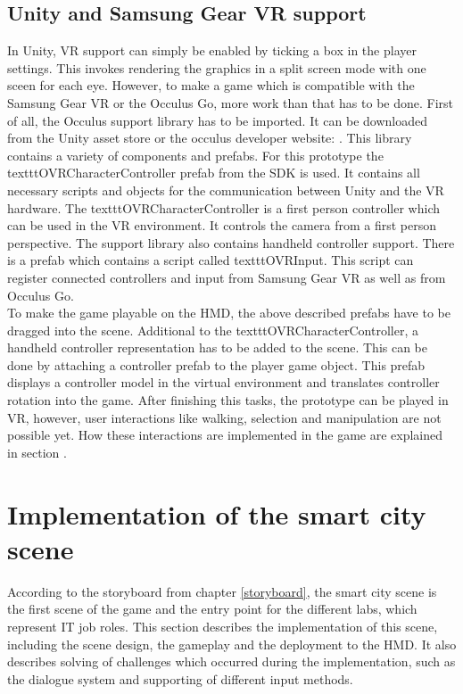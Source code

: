 \subsection{Unity and Samsung Gear VR support} \label{gearvrsupport}
In Unity, VR support can simply be enabled by ticking a box in the player settings. This invokes rendering the graphics in a split screen mode with one sceen for each eye. However, to make a game which is compatible with the Samsung Gear VR or the Occulus Go, more work than that has to be done. First of all, the Occulus support library has to be imported. It can be downloaded from the Unity asset store or the occulus developer website: \cite{Occulus.2018}. This library contains a variety of components and prefabs. For this prototype the texttt{OVRCharacterController} prefab from the SDK is used. It contains all necessary scripts and objects for the communication between Unity and the VR hardware. The texttt{OVRCharacterController} is a first person controller which can be used in the VR environment. It controls the camera from a first person perspective. The support library also contains handheld controller support. There is a prefab which contains a script called texttt{OVRInput}. This script can register connected controllers and input from Samsung Gear VR as well as from Occulus Go.\\
To make the game playable on the HMD, the above described prefabs have to be dragged into the scene. Additional to the  texttt{OVRCharacterController}, a handheld controller representation has to be added to the scene. This can be done by attaching a controller prefab to the player game object. This prefab displays a controller model in the virtual environment and translates controller rotation into the game. After finishing this tasks, the prototype can be played in VR, however, user interactions like walking, selection and manipulation are not possible yet. How these interactions are implemented in the game are explained in section \label{inputmethods}.

\section{Implementation of the smart city scene}
According to the storyboard from chapter \ref{storyboard}, the smart city scene is the first scene of the game and the entry point for the different labs, which represent IT job roles. This section describes the implementation of this scene, including the scene design, the gameplay and the deployment to the HMD. It also describes  solving of challenges which occurred during the implementation, such as the dialogue system and supporting of different input methods.

